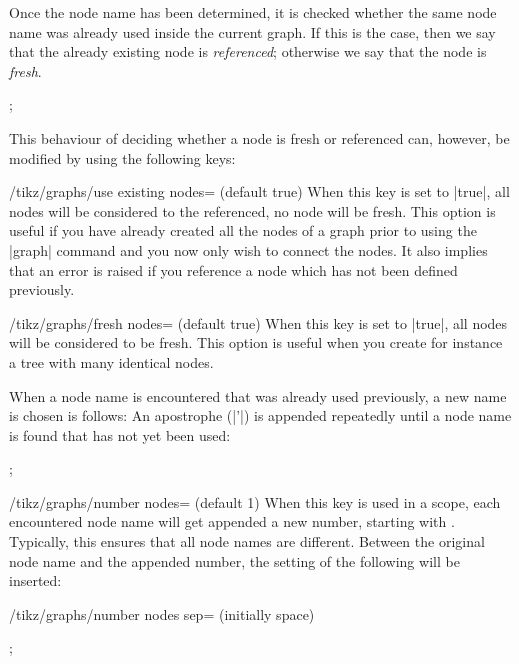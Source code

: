 Once the node name has been determined, it is checked whether the same node
name was already used inside the current graph. If this is the case, then we
say that the already existing node is \emph{referenced}; otherwise we say that
the node is \emph{fresh}.
%
\begin{codeexample}[preamble={\usetikzlibrary{graphs}}]
\tikz {};
\end{codeexample}

This behaviour of deciding whether a node is fresh or referenced can, however,
be modified by using the following keys:
%
\begin{key}{/tikz/graphs/use existing nodes= (default true)}
    When this key is set to |true|, all nodes will be considered to the
    referenced, no node will be fresh. This option is useful if you have
    already created all the nodes of a graph prior to using the |graph| command
    and you now only wish to connect the nodes. It also implies that an error
    is raised if you reference a node which has not been defined previously.
\end{key}

\begin{key}{/tikz/graphs/fresh nodes= (default true)}
    When this key is set to |true|, all nodes will be considered to be fresh.
    This option is useful when you create for instance a tree with many
    identical nodes.

    When a node name is encountered that was already used previously, a new
    name is chosen is follows: An apostrophe (|'|) is appended repeatedly until
    a node name is found that has not yet been used:
\begin{codeexample}[preamble={\usetikzlibrary{graphs}}]
\tikz {};
\end{codeexample}
\end{key}

\begin{key}{/tikz/graphs/number nodes= (default 1)}
    When this key is used in a scope, each encountered node name will get
    appended a new number, starting with . Typically, this ensures
    that all node names are different. Between the original node name and the
    appended number, the setting of the following will be inserted:
    \begin{key}{/tikz/graphs/number nodes sep= (initially \normalfont space)}
    \end{key}
\begin{codeexample}[preamble={\usetikzlibrary{graphs}}]
\tikz {};
\end{codeexample}
\end{key}


